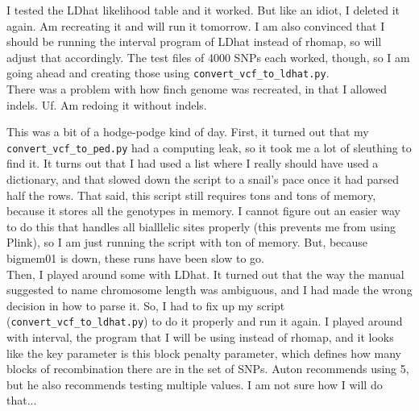\documentclass[idxtotoc,hyperref,openany,oneside]{labbook} %
\begin{document}
I tested the LDhat likelihood table and it worked. But like an idiot, I deleted it again. Am recreating it and will run it tomorrow. I am also convinced that I should be running the interval program of LDhat instead of rhomap, so will adjust that accordingly. The test files of 4000 SNPs each worked, though, so I am going ahead and creating those using \verb+convert_vcf_to_ldhat.py+. \\

There was a problem with how finch genome was recreated, in that I allowed indels. Uf. Am redoing it without indels. 

This was a bit of a hodge-podge kind of day. First, it turned out that my \verb+convert_vcf_to_ped.py+ had a computing leak, so it took me a lot of sleuthing to find it. It turns out that I had used a list where I really should have used a dictionary, and that slowed down the script to a snail's pace once it had parsed half the rows. That said, this script still requires tons and tons of memory, because it stores all the genotypes in memory. I cannot figure out an easier way to do this that handles all bialllelic sites properly (this prevents me from using Plink), so I am just running the script with ton of memory. But, because bigmem01 is down, these runs have been slow to go. \\

Then, I played around some with LDhat. It turned out that the way the manual suggested to name chromosome length was ambiguous, and I had made the wrong decision in how to parse it. So, I had to fix up my script (\verb+convert_vcf_to_ldhat.py+) to do it properly and run it again. I played around with interval, the program that I will be using instead of rhomap, and it looks like the key parameter is this block penalty parameter, which defines how many blocks of recombination there are in the set of SNPs. Auton recommends using 5, but he also recommends testing multiple values. I am not sure how I will do that... \\
\end{document}
